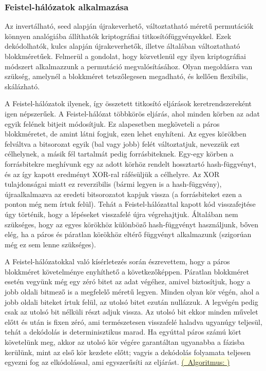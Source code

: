 \documentclass[
    parspace,
    noindent,
    nohyp,
]{elteiktdk}[2023/04/10]
\newcommand{\todoref}[1]{\todo[inline, noinlinepar, color=red, textcolor=white, inlinewidth=0.6cm, caption={#1}]{\large \textbf{×}}}
\newcommand{\algorithmref}[1]{\hyperref[algorithm:#1]{\colorbox{lightyellow}{%
(\textrightarrow~Algoritmus: \nameref*{algorithm:#1})}}}
\begin{document}
\subsubsection{Feistel-hálózatok alkalmazása}

Az invertálható, seed alapján újrakeverhető, változtatható méretű permutációk könnyen analógiába állíthatók kriptográfiai titkosítófüggvényekkel.
Ezek dekódolhatók, kulcs alapján újrakeverhetők, illetve általában változtatható blokkméretűek.
Felmerül a gondolat, hogy közvetlenül egy ilyen kriptográfiai módszert alkalmazzunk a permutáció megvalósításához.
Olyan megoldásra van szükség, amelynél a blokkméret tetszőlegesen megadható, és kellően flexibilis, skálázható.

A Feistel-hálózatok ilyenek, így összetett titkosító eljárások keretrendszereként igen népszerűek.
\todoref{+CITE: Feistel-hálózat}
A Feistel-hálózat többkörös eljárás, ahol minden körben az adat egyik felének bitjeit módosítjuk.
Ez alapesetben megköveteli a páros blokkméretet, de amint látni fogjuk, ezen lehet enyhíteni.
Az egyes körökben felváltva a bitsorozat egyik (bal vagy jobb) felét változtatjuk,
nevezzük ezt célhelynek, a másik fél tartalmát pedig forrásbiteknek.
Egy-egy körben a forrásbitekre meghívunk egy az adott körhöz rendelt hossztartó hash-függvényt,
és az így kapott eredményt XOR-ral ráfésüljük a célhelyre.
Az XOR tulajdonságai miatt ez reverzibilis (bármi legyen is a hash-függvény),
újraalkalmazva az eredeti bitsorozatot kapjuk vissza
(a forrásbiteket ezen a ponton még nem írtuk felül).
Tehát a Feistel-hálózattal kapott kód visszafejtése úgy történik, hogy a lépéseket visszafelé újra végrehajtjuk.
Általában nem szükséges, hogy az egyes körökhöz különböző hash-függvényt használjunk,
bőven elég, ha a páros és páratlan körökhöz eltérő függvényt alkalmazunk (szigorúan még ez sem lenne szükséges).

A Feistel-hálózatokkal való kísérletezés során észrevettem,
hogy a páros blokkméret követelménye enyhíthető a következőképpen.
Páratlan blokkméret esetén vegyünk még egy zéró bitet az adat végéhez,
amivel biztosítjuk, hogy a jobb oldali bitmező is a megfelelő méretű legyen.
Minden olyan kör végén, ahol a jobb oldali biteket írtuk felül, az utolsó bitet ezután nullázzuk.
A legvégén pedig csak az utolsó bit nélküli részt adjuk vissza.
Az utolsó bit ekkor minden művelet előtt és után is fixen zéró,
ami természetesen visszafelé haladva ugyanúgy teljesül, tehát a dekódolás is determinisztikus marad.
Ha egyúttal páros számú kört követelünk meg,
akkor az utolsó kör végére garantáltan ugyanabba a fázisba kerülünk, mint az első kör kezdete előtt;
vagyis a dekódolás folyamata teljesen egyezni fog az elkódolással, ami egyszerűsíti az eljárást.
\algorithmref{feistel}
\end{document}
